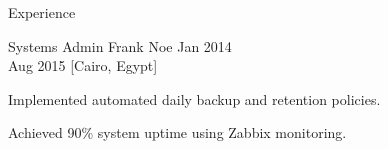 \begin{rSection}{Experience}
    \begin{rSubsection}
        {Systems Admin}
        {Frank Noe}
        {Jan 2014 \\ Aug 2015}
        [Cairo, Egypt]
        \begin{rItemize}
            \item Implemented automated daily backup and retention policies.
            \item Achieved 90\% system uptime using Zabbix monitoring.
        \end{rItemize}
    \end{rSubsection}
\end{rSection}